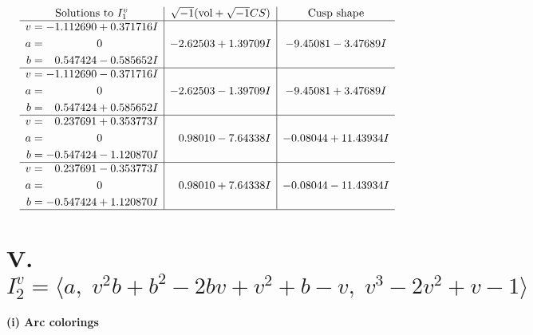 \documentclass[1p]{elsarticle_modified}
\theoremstyle{definition}
\newcommand{\I}{\sqrt{-1}}
\begin{document}
$$\begin{array}{c|c|c}  
\text{Solutions to }I^v_{1}& \I (\text{vol} + \sqrt{-1}CS) & \text{Cusp shape}\\
 \hline 
\begin{aligned}
v &= -1.112690 + 0.371716 I \\
a &= \phantom{-0.000000 } 0 \\
b &= \phantom{-}0.547424 - 0.585652 I\end{aligned}
 & -2.62503 + 1.39709 I & -9.45081 - 3.47689 I \\ \hline\begin{aligned}
v &= -1.112690 - 0.371716 I \\
a &= \phantom{-0.000000 } 0 \\
b &= \phantom{-}0.547424 + 0.585652 I\end{aligned}
 & -2.62503 - 1.39709 I & -9.45081 + 3.47689 I \\ \hline\begin{aligned}
v &= \phantom{-}0.237691 + 0.353773 I \\
a &= \phantom{-0.000000 } 0 \\
b &= -0.547424 - 1.120870 I\end{aligned}
 & \phantom{-}0.98010 - 7.64338 I & -0.08044 + 11.43934 I \\ \hline\begin{aligned}
v &= \phantom{-}0.237691 - 0.353773 I \\
a &= \phantom{-0.000000 } 0 \\
b &= -0.547424 + 1.120870 I\end{aligned}
 & \phantom{-}0.98010 + 7.64338 I & -0.08044 - 11.43934 I\\
 \hline 
 \end{array}$$\newpage\newpage\renewcommand{\arraystretch}{1}
\centering \section*{V. $I^v_{2}= \langle a,\;v^2 b+b^2-2 b v+v^2+b- v,\;v^3-2 v^2+v-1 \rangle$}
\flushleft \textbf{(i) Arc colorings}\\
\end{document}
